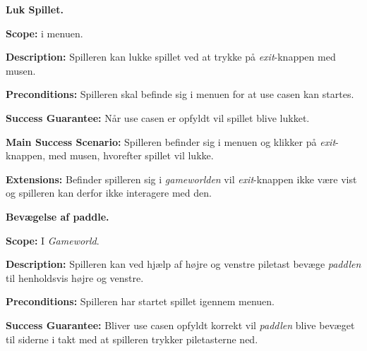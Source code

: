 \textbf{Luk Spillet.}\newline

\textbf{Scope:}\newline
i menuen. \newline

\textbf{Description:} \newline
Spilleren kan lukke spillet ved at trykke på \textit{exit}-knappen med musen.\newline

\textbf{Preconditions:}\newline
Spilleren skal befinde sig i menuen for at use casen kan startes.\newline

\textbf{Success Guarantee:}\newline
Når use casen er opfyldt vil spillet blive lukket. \newline

\textbf{Main Success Scenario:}\newline
Spilleren befinder sig i menuen og klikker på \textit{exit}-knappen, med musen, hvorefter spillet vil lukke.\newline

\textbf{Extensions:}\newline
Befinder spilleren sig i \textit{gameworlden} vil \textit{exit}-knappen ikke være vist og spilleren kan derfor ikke interagere med den. \newline \newline


\textbf{Bevægelse af paddle.}\newline

\textbf{Scope:}\newline
I \textit{Gameworld}.\newline

\textbf{Description:} \newline
Spilleren kan ved hjælp af højre og venstre piletast bevæge \textit{paddlen} til henholdsvis højre og venstre.\newline

\textbf{Preconditions:}\newline
Spilleren har startet spillet igennem menuen.\newline

\textbf{Success Guarantee:}\newline
Bliver use casen opfyldt korrekt vil \textit{paddlen} blive bevæget til siderne i takt med at spilleren trykker piletasterne ned.\newline

